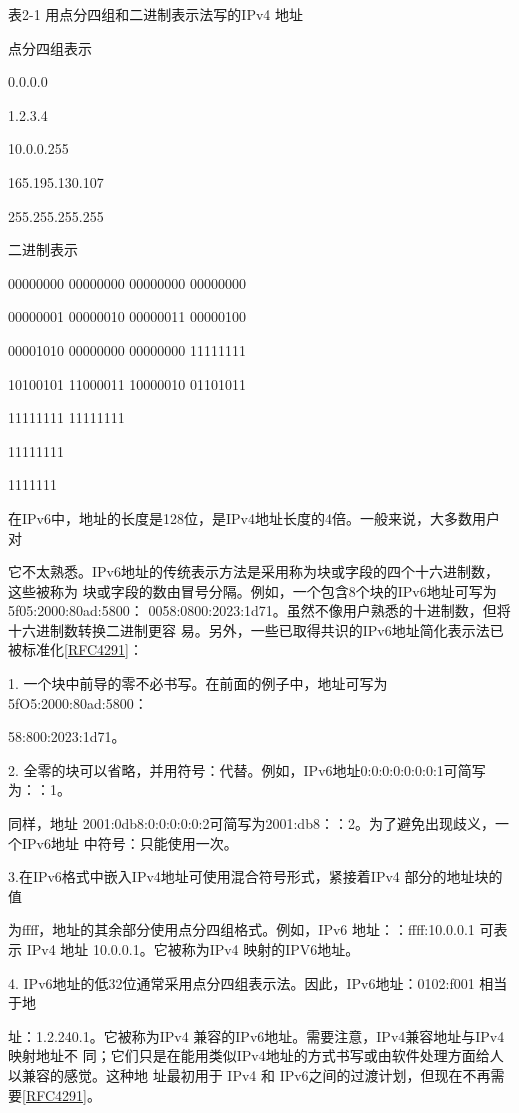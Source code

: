 表2-1 用点分四组和二进制表示法写的IPv4 地址

点分四组表示

0.0.0.0

1.2.3.4

10.0.0.255

165.195.130.107

255.255.255.255

二进制表示

00000000 00000000 00000000 00000000

00000001 00000010 00000011 00000100

00001010 00000000 00000000 11111111

10100101 11000011 10000010 01101011

11111111 11111111

11111111

1111111

在IPv6中，地址的长度是128位，是IPv4地址长度的4倍。一般来说，大多数用户对

它不太熟悉。IPv6地址的传统表示方法是采用称为块或字段的四个十六进制数，这些被称为
块或字段的数由冒号分隔。例如，一个包含8个块的IPv6地址可写为 5f05:2000:80ad:5800：
0058:0800:2023:1d71。虽然不像用户熟悉的十进制数，但将十六进制数转换二进制更容
易。另外，一些已取得共识的IPv6地址简化表示法已被标准化\href{https://www.rfc-editor.org/rfc/rfc4291}{[RFC4291]}：

1. 一个块中前导的零不必书写。在前面的例子中，地址可写为5fO5:2000:80ad:5800：

58:800:2023:1d71。

2. 全零的块可以省略，并用符号：代替。例如，IPv6地址0:0:0:0:0:0:0:1可简写为：：1。

同样，地址 2001:0db8:0:0:0:0:0:2可简写为2001:db8：：2。为了避免出现歧义，一个IPv6地址
中符号：只能使用一次。

3.在IPv6格式中嵌入IPv4地址可使用混合符号形式，紧接着IPv4 部分的地址块的值

为ffff，地址的其余部分使用点分四组格式。例如，IPv6 地址：：ffff:10.0.0.1 可表示 IPv4 地址
10.0.0.1。它被称为IPv4 映射的IPV6地址。

4. IPv6地址的低32位通常采用点分四组表示法。因此，IPv6地址：0102:f001 相当于地

址：1.2.240.1。它被称为IPv4 兼容的IPv6地址。需要注意，IPv4兼容地址与IPv4 映射地址不
同；它们只是在能用类似IPv4地址的方式书写或由软件处理方面给人以兼容的感觉。这种地
址最初用于 IPv4 和 IPv6之间的过渡计划，但现在不再需要\href{https://www.rfc-editor.org/rfc/rfc4291}{[RFC4291]}。

